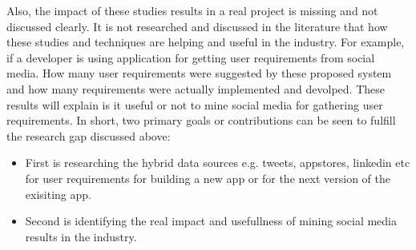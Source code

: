 Also, the impact of these studies results in a real project is missing and
not discussed clearly. It is not researched and discussed in the literature that how these studies and techniques are helping and useful in the industry. For example, if a developer is using application for getting user requirements from social media. How many user requirements were suggested by these proposed system and how many requirements were actually implemented and devolped. These results will explain is it useful or not to mine social media for gathering user requirements. In short, two primary goals or contributions can be seen to fulfill the research gap discussed above:\\
\begin{itemize}
  \item First is researching the hybrid data sources e.g. tweets, appstores, linkedin etc for user requirements for building a new app or for the next version of the exisiting app.
  \item Second is identifying the real impact and usefullness of mining social media results in the industry.
\end{itemize}

\newpage